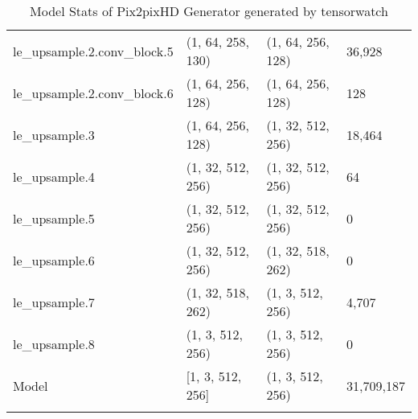 \begin{longtable}{llll}
        le\_upsample.2.conv\_block.5 &  (1, 64, 258, 130) &  (1, 64, 256, 128) &      36,928 \\
        le\_upsample.2.conv\_block.6 &  (1, 64, 256, 128) &  (1, 64, 256, 128) &         128 \\
                    le\_upsample.3 &  (1, 64, 256, 128) &  (1, 32, 512, 256) &      18,464 \\
                    le\_upsample.4 &  (1, 32, 512, 256) &  (1, 32, 512, 256) &          64 \\
                    le\_upsample.5 &  (1, 32, 512, 256) &  (1, 32, 512, 256) &           0 \\
                    le\_upsample.6 &  (1, 32, 512, 256) &  (1, 32, 518, 262) &           0 \\
                    le\_upsample.7 &  (1, 32, 518, 262) &   (1, 3, 512, 256) &       4,707 \\
                    le\_upsample.8 &   (1, 3, 512, 256) &   (1, 3, 512, 256) &           0 \\
                            Model &   [1, 3, 512, 256] &   (1, 3, 512, 256) &  31,709,187 \\
    \bottomrule
    \caption{Model Stats of Pix2pixHD Generator generated by tensorwatch}
    \label{Pix2pixHD generator table}
\end{longtable}  
    
